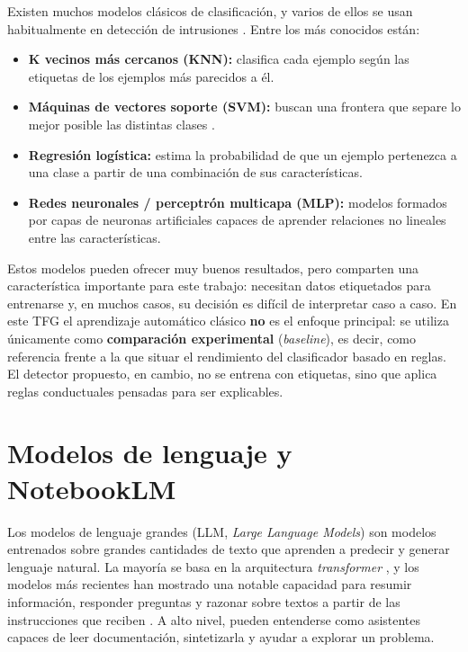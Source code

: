Existen muchos modelos clásicos de clasificación, y varios de ellos se usan habitualmente en detección de intrusiones \cite{buczak2016survey}. Entre los más conocidos están:

\begin{itemize}
  \item \textbf{K vecinos más cercanos (KNN):} clasifica cada ejemplo según las etiquetas de los ejemplos más parecidos a él.
  \item \textbf{Máquinas de vectores soporte (SVM):} buscan una frontera que separe lo mejor posible las distintas clases \cite{cortes1995support}.
  \item \textbf{Regresión logística:} estima la probabilidad de que un ejemplo pertenezca a una clase a partir de una combinación de sus características.
  \item \textbf{Redes neuronales / perceptrón multicapa (MLP):} modelos formados por capas de neuronas artificiales capaces de aprender relaciones no lineales entre las características.
\end{itemize}

Estos modelos pueden ofrecer muy buenos resultados, pero comparten una característica importante para este trabajo: necesitan datos etiquetados para entrenarse y, en muchos casos, su decisión es difícil de interpretar caso a caso. En este TFG el aprendizaje automático clásico \textbf{no} es el enfoque principal: se utiliza únicamente como \textbf{comparación experimental} (\emph{baseline}), es decir, como referencia frente a la que situar el rendimiento del clasificador basado en reglas. El detector propuesto, en cambio, no se entrena con etiquetas, sino que aplica reglas conductuales pensadas para ser explicables.

\section{Modelos de lenguaje y NotebookLM}
\label{sec:concep_llm}

Los modelos de lenguaje grandes (LLM, \emph{Large Language Models}) son modelos entrenados sobre grandes cantidades de texto que aprenden a predecir y generar lenguaje natural. La mayoría se basa en la arquitectura \emph{transformer} \cite{vaswani2017attention}, y los modelos más recientes han mostrado una notable capacidad para resumir información, responder preguntas y razonar sobre textos a partir de las instrucciones que reciben \cite{brown2020language}. A alto nivel, pueden entenderse como asistentes capaces de leer documentación, sintetizarla y ayudar a explorar un problema.

